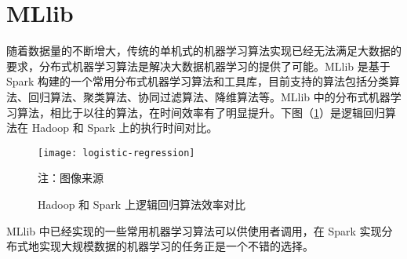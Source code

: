 \section{MLlib}
随着数据量的不断增大，传统的单机式的机器学习算法实现已经无法满足大数据的要求，分布式机器学习算法是解决大数据机器学习的提供了可能。MLlib 是基于 Spark 构建的一个常用分布式机器学习算法和工具库，目前支持的算法包括分类算法、回归算法、聚类算法、协同过滤算法、降维算法等。MLlib 中的分布式机器学习算法，相比于以往的算法，在时间效率有了明显提升。下图（\ref{fig:logistic-regression}）是逻辑回归算法在 Hadoop 和 Spark 上的执行时间对比。
\begin{figure}[H]
  \centering
  \texttt{[image: logistic-regression]}
  \caption{Hadoop 和 Spark 上逻辑回归算法效率对比}
  \label{fig:logistic-regression}
  \footnotesize 注：图像来源\protect\footnotemark
\end{figure}
MLlib 中已经实现的一些常用机器学习算法可以供使用者调用，在 Spark 实现分布式地实现大规模数据的机器学习的任务正是一个不错的选择。

